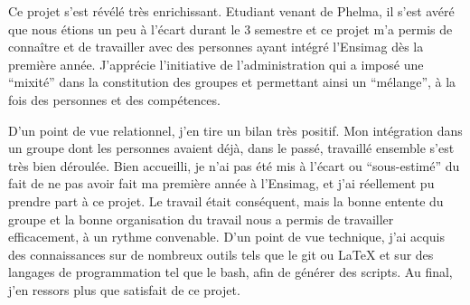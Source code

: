 Ce projet s'est révélé très enrichissant. Etudiant venant de Phelma, il s'est avéré que nous étions un peu à l'écart durant le 3 semestre et ce projet m'a permis de connaître et de travailler avec des personnes ayant intégré l'Ensimag dès la première année. J'apprécie l'initiative de
l'administration qui a imposé une ``mixité'' dans la constitution des groupes et permettant ainsi un ``mélange'', à la fois des personnes et des compétences.

D'un point de vue relationnel, j'en tire un bilan très positif. Mon intégration dans un groupe dont les personnes avaient déjà, dans le passé,
travaillé ensemble s'est très bien déroulée. Bien accueilli, je n'ai pas été mis à l'écart ou ``sous-estimé'' du fait de ne pas avoir fait ma 
première année à l'Ensimag, et j'ai réellement pu prendre part à ce projet. Le travail était conséquent, mais la bonne entente du groupe
et la bonne organisation du travail nous a permis de travailler efficacement, à un rythme convenable. D'un point de vue technique, j'ai 
acquis des connaissances sur de nombreux outils tels que le git ou \LaTeX{} et sur des langages de programmation tel que le bash, afin de générer des scripts. Au final, j'en ressors plus que satisfait de ce projet. 
